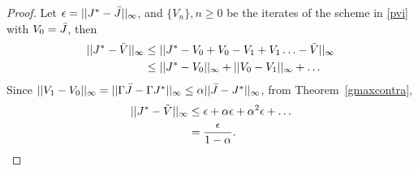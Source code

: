 \documentclass[12pt,draftcls,onecolumn]{IEEEtran}
\begin{document}
\begin{proof}
Let $\epsilon=||J^*-\bar{J}||_\infty$, and $\{V_n\},n\geq 0$ be the iterates of the scheme in \eqref{pvi} with $V_0=\bar{J}$, then
\begin{align}
||J^*-\tilde{V}||_\infty&\leq ||J^*-V_0+V_0-V_1+V_1\ldots-\tilde{V}||_\infty\nonumber\\
&\leq ||J^*-V_0||_\infty+||V_0-V_1||_\infty+\ldots\nonumber
\end{align}
Since $||V_1-V_0||_\infty=||\Gamma \bar{J}-\Gamma J^*||_\infty\leq\alpha||\bar{J}-J^*||_\infty$, from Theorem~\ref{gmaxcontra},
\begin{align}
||J^*-\tilde{V}||_\infty&\leq \epsilon+\alpha\epsilon+\alpha^2\epsilon+\ldots\nonumber\\
&=\frac{\epsilon}{1-\alpha}.
\end{align}
\end{proof}
\end{document}
